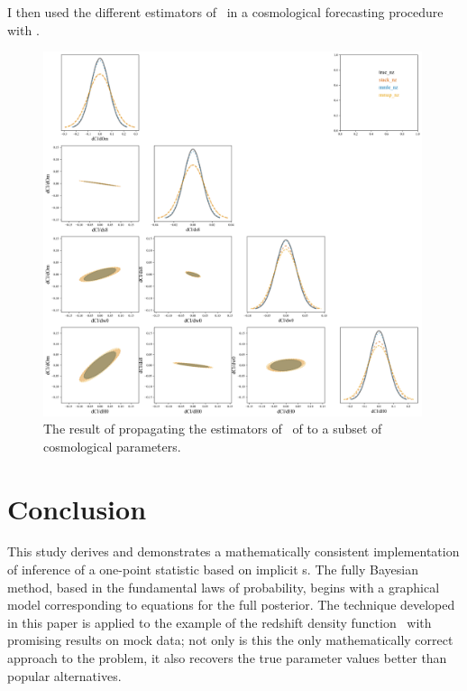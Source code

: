 I then used the different estimators of \nz\ in a cosmological forecasting procedure with \cosmolike.

\begin{figure}
	\begin{center}
		\includegraphics[width=0.99\textwidth]{figures/chippr/final_plot.png}
		\caption{The result of propagating the estimators of \nz\ of  to a subset of cosmological parameters.}
	\end{center}
\end{figure}

\section{Conclusion}

This study derives and demonstrates a mathematically consistent implementation of inference of a one-point statistic based on implicit \pzpdf s.  
The fully Bayesian method, based in the fundamental laws of probability, begins with a graphical model corresponding to equations for the full posterior.  
The technique developed in this paper is applied to the example of the redshift density function \nz\ with promising results on mock data; not only is this the only mathematically correct approach to the problem, it also recovers the true parameter values better than popular alternatives.  

